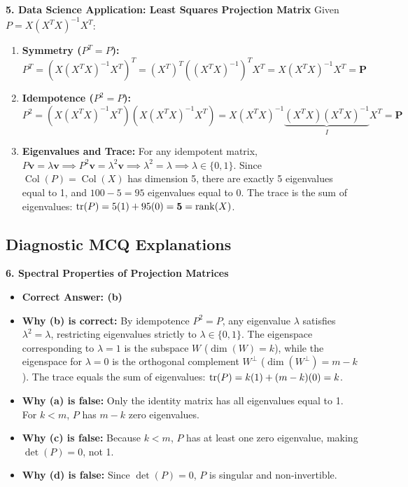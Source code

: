 \textbf{5. Data Science Application: Least Squares Projection Matrix}
Given $P = X(X^T X)^{-1} X^T$:
\begin{enumerate}
    \item \textbf{Symmetry ($P^T = P$):}
    \begin{equation*}
    P^T = \left( X (X^T X)^{-1} X^T \right)^T = (X^T)^T \left( (X^T X)^{-1} \right)^T X^T = X (X^T X)^{-1} X^T = \mathbf{P}
    \end{equation*}
    \item \textbf{Idempotence ($P^2 = P$):}
    \begin{equation*}
    P^2 = \left(X(X^T X)^{-1} X^T\right) \left(X(X^T X)^{-1} X^T\right) = X (X^T X)^{-1} \underbrace{(X^T X) (X^T X)^{-1}}_{I} X^T = \mathbf{P}
    \end{equation*}
    \item \textbf{Eigenvalues and Trace:}
    For any idempotent matrix, $P\mathbf{v} = \lambda \mathbf{v} \implies P^2 \mathbf{v} = \lambda^2 \mathbf{v} \implies \lambda^2 = \lambda \implies \lambda \in \{0, 1\}$.
    Since $\operatorname{Col}(P) = \operatorname{Col}(X)$ has dimension 5, there are exactly 5 eigenvalues equal to 1, and $100 - 5 = 95$ eigenvalues equal to 0.
    The trace is the sum of eigenvalues: $\operatorname{tr}(P) = 5(1) + 95(0) = \mathbf{5} = \operatorname{rank}(X)$.
\end{enumerate}

\subsection*{Diagnostic MCQ Explanations}

\textbf{6. Spectral Properties of Projection Matrices}
\begin{itemize}
    \item \textbf{Correct Answer: (b)}
    \item \textbf{Why (b) is correct:} By idempotence $P^2 = P$, any eigenvalue $\lambda$ satisfies $\lambda^2 = \lambda$, restricting eigenvalues strictly to $\lambda \in \{0, 1\}$. The eigenspace corresponding to $\lambda = 1$ is the subspace $W$ ($\dim(W) = k$), while the eigenspace for $\lambda = 0$ is the orthogonal complement $W^\perp$ ($\dim(W^\perp) = m - k$). The trace equals the sum of eigenvalues: $\operatorname{tr}(P) = k(1) + (m - k)(0) = k$.
    \item \textbf{Why (a) is false:} Only the identity matrix has all eigenvalues equal to 1. For $k < m$, $P$ has $m - k$ zero eigenvalues.
    \item \textbf{Why (c) is false:} Because $k < m$, $P$ has at least one zero eigenvalue, making $\det(P) = 0$, not 1.
    \item \textbf{Why (d) is false:} Since $\det(P) = 0$, $P$ is singular and non-invertible.
\end{itemize}

